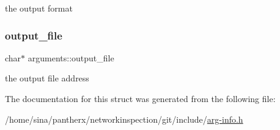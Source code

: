 the output format 

\mbox{\label{structarguments_ab967f3c192207878cfe15464aeafb551}} 
\subsubsection{\texorpdfstring{output\+\_\+file}{output\_file}}
{\footnotesize\ttfamily char$\ast$ arguments\+::output\+\_\+file}



the output file address 



The documentation for this struct was generated from the following file\+:\begin{DoxyCompactItemize}
\item 
/home/sina/pantherx/networkinspection/git/include/\hyperlink{arg-info_8h}{arg-\/info.\+h}\end{DoxyCompactItemize}
